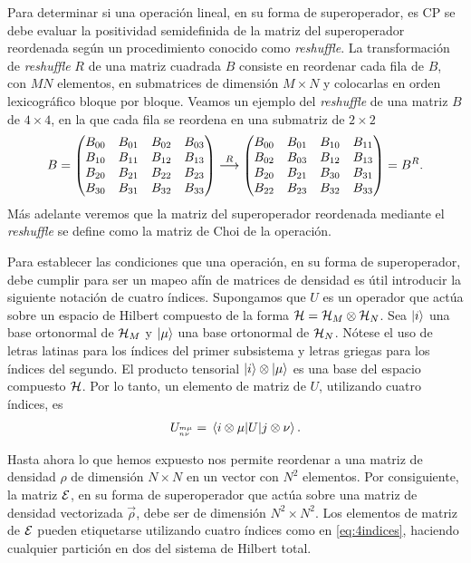 Para determinar si una operación lineal, en su forma de superoperador, es CP 
se debe evaluar la positividad semidefinida de la matriz del superoperador
reordenada según un procedimiento conocido como \textit{reshuffle}.
La transformación de \textit{reshuffle} $R$ de una matriz cuadrada $B$ 
consiste en reordenar cada fila de $B$, con $MN$ elementos, 
en submatrices de dimensión $M\times N$ y colocarlas en 
orden lexicográfico bloque por bloque. Veamos un ejemplo del 
\textit{reshuffle} de una matriz $B$ de $4\times 4$, en la que 
cada fila se reordena en una submatriz de $2\times 2$
\begin{align}
B=
\mqty(
B_{00}&B_{01}&B_{02}&B_{03}\\
B_{10}&B_{11}&B_{12}&B_{13}\\
B_{20}&B_{21}&B_{22}&B_{23}\\
B_{30}&B_{31}&B_{32}&B_{33})
\stackrel{R}{\longrightarrow}
\mqty(
B_{00}&B_{01}&B_{10}&B_{11}\\
B_{02}&B_{03}&B_{12}&B_{13}\\
B_{20}&B_{21}&B_{30}&B_{31}\\
B_{22}&B_{23}&B_{32}&B_{33})
=B^R.
\label{eq:reshuffle}
\end{align}
Más adelante veremos que la matriz del superoperador 
reordenada mediante el \textit{reshuffle} se define como la matriz de Choi
de la operación.

Para establecer las condiciones que una operación, en su
forma de superoperador, debe cumplir para ser un mapeo afín de
matrices de densidad es útil introducir la siguiente notación de cuatro índices. 
Supongamos que $U$ es un operador que actúa sobre un espacio de Hilbert 
compuesto de la forma $\mathcal{H}=\mathcal{H}_M\otimes\mathcal{H}_N$.
Sea $\ket{i}$ una base ortonormal de $\mathcal{H}_M$ y $\ket{\mu}$ una base
ortonormal de $\mathcal{H}_N$. Nótese el uso de letras latinas para los índices del
primer subsistema y letras griegas para los índices del segundo.
El producto tensorial $\ket{i}\otimes\ket{\mu}$
es una base del espacio compuesto $\mathcal{H}$. Por lo tanto, un 
elemento de matriz de $U$, utilizando cuatro índices, es
\begin{align}
U_\ind{m\mu}{n\nu}=\matrixel{i\otimes \mu}{U}{j\otimes \nu}.
\label{eq:4indices}
\end{align}

Hasta ahora lo que hemos expuesto nos permite reordenar a una matriz
de densidad $\rho$ de dimensión $N\times N$ en un vector con $N^2$ 
elementos. Por consiguiente, la matriz $\mathcal{E}$, en su forma de 
superoperador que actúa sobre una matriz de densidad vectorizada $\vec{\rho}$, 
debe ser de dimensión $N^2\times N^2$. Los elementos de matriz de
$\mathcal{E}$ pueden etiquetarse utilizando cuatro índices como en \eqref{eq:4indices},
haciendo cualquier partición en dos del sistema de Hilbert total.


